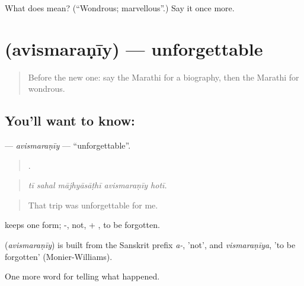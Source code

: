 \begin{tcolorbox}[breakable,colback=teal!4,colframe=teal!35!black,title={Before you move on}]
What does  mean? (\textquotedblleft{}Wondrous; marvellous\textquotedblright{}.) Say it once more.
\end{tcolorbox}
\section[\texorpdfstring{\mr{अविस्मरणीय} (avismaraṇīy)}{अविस्मरणीय (avismaraṇīy)}]{ (avismaraṇīy) — unforgettable}

\label{lesson:MR-C341-avismaraniy}



\begin{quote}
Before the new one: say the Marathi for a biography, then the Marathi for wondrous.
\end{quote}

\subsection*{You'll want to know: }
\textbf{} — \emph{avismaraṇīy} — \textquotedblleft{}unforgettable\textquotedblright{}.

\begin{quote}
    .
\end{quote}

\begin{quote}
\emph{tī sahal mājhyāsāṭhī avismaraṇīy hotī.}
\end{quote}

\begin{quote}
That trip was unforgettable for me.
\end{quote}

 keeps one form; -, not, + , to be forgotten.

\begin{cousinweb}
\textbf{} (\emph{avismaraṇīy}) is built from the Sanskrit prefix \emph{a-}, 'not', and \emph{vismaraṇīya}, 'to be forgotten' (Monier-Williams).
\end{cousinweb}

\begin{grammarlens}[title={What you've built}]
One more word for telling what happened.
\end{grammarlens}

